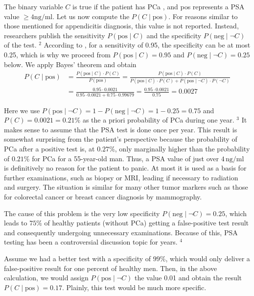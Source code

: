 \documentclass[10pt]{book}
\begin{document}
The binary variable $C$ is true if the patient has PCa , and pos represents a PSA value $\geq 4 \mathrm{ng} / \mathrm{ml}$. Let us now compute the $P(C \mid \text{pos})$. For reasons similar to those mentioned for appendicitis diagnosis, this value is not reported. Instead, researchers publish the sensitivity $P(\text{pos} \mid C)$ and the specificity $P(\text{neg} \mid \neg C)$ of the test. ${ }^{2}$ According to \cite{hammerer2004psa}, for a sensitivity of 0.95, the specificity can be at most 0.25, which is why we proceed from $P(\text{pos}\mid C)=0.95$ and $P(\text{neg}\mid \neg C)=0.25$ below. We apply Bayes' theorem and obtain
$$
\begin{aligned}
P(C \mid \text{pos}) &= \frac{P(\text{pos} \mid C) \cdot P(C)}{P(\text{pos})}
= \frac{P(\text{pos} \mid C) \cdot P(C)}{P(\text{pos} \mid C) \cdot P(C) + P(\text{pos} \mid \neg C) \cdot P(\neg C)} \\
&= \frac{0.95 \cdot 0.0021}{0.95 \cdot 0.0021 + 0.75 \cdot 0.99679}
= \frac{0.95 \cdot 0.0021}{0.75} = 0.0027
\end{aligned}
$$

Here we use $P(\text{pos} \mid \neg C)=1-P(\text{neg} \mid \neg C)=1-0.25=0.75$ and $P(C)=0.0021=0.21\%$ as the a priori probability of PCa during one year. ${ }^{3}$ It makes sense to assume that the PSA test is done once per year. This result is somewhat surprising from the patient's perspective because the probability of PCa after a positive test is, at $0.27\%$, only marginally higher than the probability of $0.21\%$ for PCa for a 55-year-old man. Thus, a PSA value of just over $4\,\mathrm{ng}/\mathrm{ml}$ is definitively no reason for the patient to panic. At most it is used as a basis for further examinations, such as biopsy or MRI, leading if necessary to radiation and surgery. The situation is similar for many other tumor markers such as those for colorectal cancer or breast cancer diagnosis by mammography.

The cause of this problem is the very low specificity $P(\text{neg} \mid \neg C)=0.25$, which leads to $75\%$ of healthy patients (without PCa) getting a false-positive test result and consequently undergoing unnecessary examinations. Because of this, PSA testing has been a controversial discussion topic for years. ${ }^{4}$

Assume we had a better test with a specificity of $99\%$, which would only deliver a false-positive result for one percent of healthy men. Then, in the above calculation, we would assign $P(\text{pos} \mid \neg C)$ the value 0.01 and obtain the result $P(C \mid \text{pos})=0.17$. Plainly, this test would be much more specific.
\end{document}
